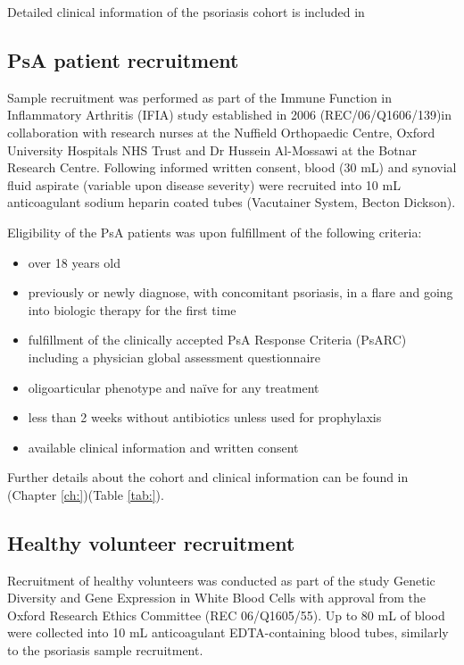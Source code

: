 Detailed clinical information of the psoriasis cohort is included in %

\subsection{PsA patient recruitment}
Sample recruitment was performed as part of the Immune Function in Inflammatory Arthritis (IFIA) study established in 2006 (REC/06/Q1606/139)in collaboration with research nurses at the Nuffield Orthopaedic Centre, Oxford University Hospitals NHS Trust and Dr Hussein Al-Mossawi at the Botnar Research Centre. Following informed written consent, blood (30 mL) and synovial fluid aspirate (variable upon disease severity) were recruited into 10 mL anticoagulant sodium heparin coated tubes (Vacutainer System, Becton Dickson).

Eligibility of the PsA patients was upon fulfillment of the following criteria:
\begin{itemize}
  \item over 18 years old
  \item previously or newly diagnose, with concomitant psoriasis, in a flare and going into biologic therapy for the first time %
	\item fulfillment of the clinically accepted PsA Response Criteria (PsARC) including a physician global assessment questionnaire \parencite{Philipp2011,Clegg1996}
	\item oligoarticular phenotype and na\"{i}ve for any treatment
	\item less than 2 weeks without antibiotics unless used for prophylaxis %
	\item available clinical information and written consent
\end{itemize}

Further details about the cohort and clinical information can be found in (Chapter \ref{ch:})(Table \ref{tab:}).

\subsection{Healthy volunteer recruitment}
Recruitment of healthy volunteers was conducted as part of the study Genetic Diversity and Gene Expression in White Blood Cells with approval from the Oxford Research Ethics Committee (REC 06/Q1605/55). Up to 80 mL of blood were collected into 10 mL anticoagulant EDTA-containing blood tubes, similarly to the psoriasis sample recruitment.

